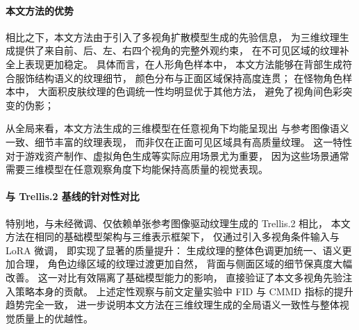 \paragraph{本文方法的优势}

相比之下，本文方法由于引入了多视角扩散模型生成的先验信息，
为三维纹理生成提供了来自前、后、左、右四个视角的完整外观约束，
在不可见区域的纹理补全上表现更加稳定。
具体而言，在人形角色样本中，
本文方法能够在背部生成符合服饰结构语义的纹理细节，
颜色分布与正面区域保持高度连贯；
在怪物角色样本中，
大面积皮肤纹理的色调统一性均明显优于其他方法，
避免了视角间色彩突变的伪影；

从全局来看，本文方法生成的三维模型在任意视角下均能呈现出
与参考图像语义一致、细节丰富的纹理表现，
而非仅在正面可见区域具有高质量纹理。
这一特性对于游戏资产制作、虚拟角色生成等实际应用场景尤为重要，
因为这些场景通常需要三维模型在任意观察角度下均能保持高质量的视觉表现。

\paragraph{与 Trellis.2 基线的针对性对比}

特别地，与未经微调、仅依赖单张参考图像驱动纹理生成的 Trellis.2 相比，
本文方法在相同的基础模型架构与三维表示框架下，
仅通过引入多视角条件输入与 LoRA 微调，
即实现了显著的质量提升：
生成纹理的整体色调更加统一、语义更加合理，
角色边缘区域的纹理过渡更加自然，
背面与侧面区域的细节保真度大幅改善。
这一对比有效隔离了基础模型能力的影响，
直接验证了本文多视角先验注入策略本身的贡献。
上述定性观察与前文定量实验中 FID 与 CMMD 指标的提升趋势完全一致，
进一步说明本文方法在三维纹理生成的全局语义一致性与整体视觉质量上的优越性。
